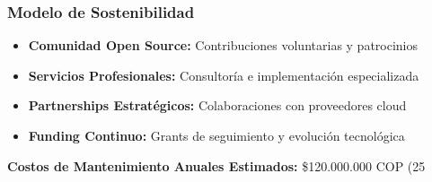 \subsubsection{Modelo de Sostenibilidad}
\begin{itemize}
    \item \textbf{Comunidad Open Source:} Contribuciones voluntarias y patrocinios
    \item \textbf{Servicios Profesionales:} Consultoría e implementación especializada
    \item \textbf{Partnerships Estratégicos:} Colaboraciones con proveedores cloud
    \item \textbf{Funding Continuo:} Grants de seguimiento y evolución tecnológica
\end{itemize}

\textbf{Costos de Mantenimiento Anuales Estimados:} \$120.000.000 COP (25%
